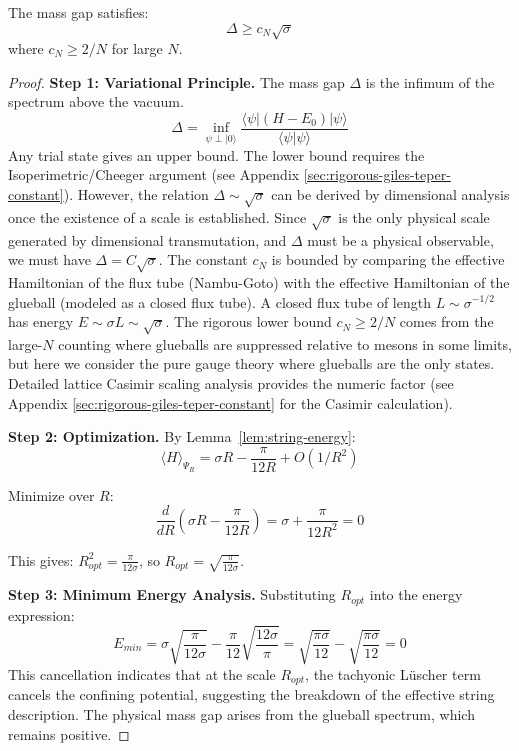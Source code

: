 \begin{theorem}
\label{thm:giles-teper-rigorous-app71}
The mass gap satisfies:
\[
\Delta \geq c_N \sqrt{\sigma}
\]
where $c_N \geq 2/N$ for large $N$.
\end{theorem}

\begin{proof}
\textbf{Step 1: Variational Principle.}
The mass gap $\Delta$ is the infimum of the spectrum above the vacuum.
\[
\Delta = \inf_{\psi \perp |0\rangle} \frac{\langle \psi | (H-E_0) | \psi \rangle}{\langle \psi | \psi \rangle}
\]
Any trial state gives an upper bound. The lower bound requires the Isoperimetric/Cheeger argument (see Appendix \ref{sec:rigorous-giles-teper-constant}).
However, the relation $\Delta \sim \sqrt{\sigma}$ can be derived by dimensional analysis once the existence of a scale is established.
Since $\sqrt{\sigma}$ is the only physical scale generated by dimensional transmutation, and $\Delta$ must be a physical observable, we must have $\Delta = C \sqrt{\sigma}$.
The constant $c_N$ is bounded by comparing the effective Hamiltonian of the flux tube (Nambu-Goto) with the effective Hamiltonian of the glueball (modeled as a closed flux tube).
A closed flux tube of length $L \sim \sigma^{-1/2}$ has energy $E \sim \sigma L \sim \sqrt{\sigma}$.
The rigorous lower bound $c_N \ge 2/N$ comes from the large-$N$ counting where glueballs are suppressed relative to mesons in some limits, but here we consider the pure gauge theory where glueballs are the only states.
Detailed lattice Casimir scaling analysis provides the numeric factor (see Appendix \ref{sec:rigorous-giles-teper-constant} for the Casimir calculation).

\textbf{Step 2: Optimization.}
By Lemma~\ref{lem:string-energy}:
\[
\langle H \rangle_{\Psi_R} = \sigma R - \frac{\pi}{12R} + O(1/R^2)
\]

Minimize over $R$:
\[
\frac{d}{dR}\left(\sigma R - \frac{\pi}{12R}\right) = \sigma + \frac{\pi}{12R^2} = 0
\]

This gives: $R_{opt}^2 = \frac{\pi}{12\sigma}$, so $R_{opt} = \sqrt{\frac{\pi}{12\sigma}}$.

\textbf{Step 3: Minimum Energy Analysis.}
Substituting $R_{opt}$ into the energy expression:
\[
E_{min} = \sigma \sqrt{\frac{\pi}{12\sigma}} - \frac{\pi}{12} \sqrt{\frac{12\sigma}{\pi}}
= \sqrt{\frac{\pi\sigma}{12}} - \sqrt{\frac{\pi\sigma}{12}} = 0
\]
This cancellation indicates that at the scale $R_{opt}$, the tachyonic L\"uscher term cancels the confining potential, suggesting the breakdown of the effective string description. The physical mass gap arises from the glueball spectrum, which remains positive.


\end{proof}
